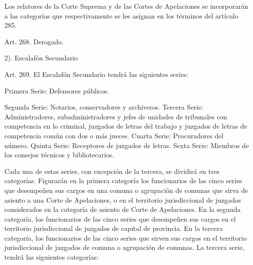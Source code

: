     Los relatores de la Corte Suprema y de las Cortes de Apelaciones se incorporarán a las categorías que respectivamente se les asignan en los términos del artículo 285.


    Art. 268. Derogado.



    2). Escalafón Secundario


    Art. 269. El Escalafón Secundario tendrá las siguientes series:

    Primera Serie: Defensores públicos.

    Segunda Serie: Notarios, conservadores y archiveros.
    Tercera Serie: Administradores, subadministradores y jefes de unidades de tribunales con competencia en lo criminal, juzgados de letras del trabajo y juzgados de letras de competencia común con dos o más jueces.
    Cuarta Serie: Procuradores del número.
    Quinta Serie: Receptores de juzgados de letras.
    Sexta Serie: Miembros de los consejos técnicos y bibliotecarios.

    Cada una de estas series, con excepción de la tercera, se dividirá en tres categorías.
    Figurarán en la primera categoría los funcionarios de las cinco series que desempeñen sus cargos en una comuna o agrupación de comunas que sirva de asiento a una Corte de Apelaciones, o en el territorio jurisdiccional de juzgados considerados en la categoría de asiento de Corte de Apelaciones.
    En la segunda categoría, los funcionarios de las cinco series que desempeñen sus cargos en el territorio jurisdiccional de juzgados de capital de provincia.
    En la tercera categoría, los funcionarios de las cinco series que sirven sus cargos en el territorio jurisdiccional de juzgados de comuna o agrupación de comunas.
    La tercera serie, tendrá las siguientes categorías:

